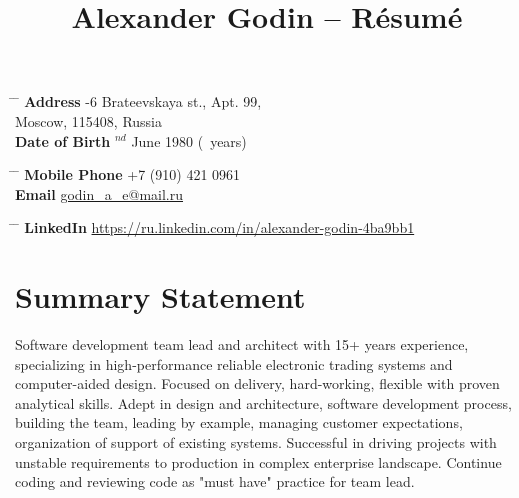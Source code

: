 \documentclass[10pt]{article} %
\begin{document}

\title{Alexander Godin -- Résumé} %


\parbox{0.5\textwidth}{
\begin{tabbing} %
\hspace{3cm} \= \hspace{4cm} \= \kill %
{\bf Address} -6 Brateevskaya st., Apt. 99, \\ %
\> Moscow, 115408, Russia \\ %
{\bf Date of Birth} $^{nd}$ June 1980 (\myage\ years)\\ %
\end{tabbing}}
\vspace{-10mm}
\hfill
\parbox{0.5\textwidth}{
\begin{tabbing}
\hspace{3cm} \= \hspace{4cm} \= \kill %
{\bf Mobile Phone} \> +7 (910) 421 0961 \\ %
{\bf Email} \> \href{mailto:godin\_a\_e@mail.ru}{godin\_a\_e@mail.ru}
\end{tabbing}}
\parbox{0.5\textwidth}{
\begin{tabbing}
\hspace{3cm} \= \hspace{4cm} \= \kill %
{\bf LinkedIn} \> \href{https://ru.linkedin.com/in/alexander-godin-4ba9bb1}{https://ru.linkedin.com/in/alexander-godin-4ba9bb1}
\end{tabbing}}


\section{Summary Statement}

Software development team lead and architect with 15+ years experience, specializing 
in high-performance reliable electronic trading systems and computer-aided design.
Focused on delivery, hard-working, flexible with proven analytical skills. Adept in design
and architecture, software development process, building the team, leading by example,
managing customer expectations, organization of support of existing systems. Successful in
driving projects with unstable requirements to production in complex enterprise landscape.
Continue coding and reviewing code as "must have" practice for team lead.
\end{document}
